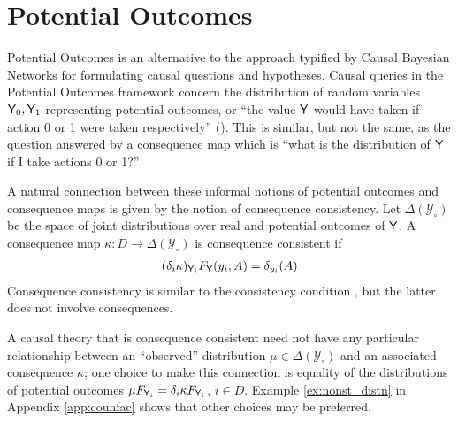 
\section{Potential Outcomes}

Potential Outcomes is an alternative to the approach typified by Causal Bayesian Networks for formulating causal questions and hypotheses. Causal queries in the Potential Outcomes framework concern the distribution of random variables $\mathsf{Y}_0, \mathsf{Y}_1$ representing potential outcomes, or ``the value $\mathsf{Y}$ would have taken if action 0 or 1 were taken respectively'' (\cite{hernan_causal_2018}). This is similar, but not the same, as the question answered by a consequence map which is ``what is the distribution of $\mathsf{Y}$ if I take actions 0 or 1?''

A natural connection between these informal notions of potential outcomes and consequence maps is given by the notion of consequence consistency. Let $\Delta(\mathcal{Y}_\circ)$ be the space of joint distributions over real and potential outcomes of $\mathsf{Y}$. A consequence map $\kappa:D\to \Delta(\mathcal{Y}_\circ)$ is consequence consistent if
\begin{align}
    (\delta_i\kappa)_{\mathsf{Y}_i} F_{\mathsf{Y}} (y_i;A)=\delta_{y_i}(A) \label{eq:oc_consist}
\end{align} 
Consequence consistency is similar to the consistency condition \citep{richardson2013single}, but the latter does not involve consequences.

A causal theory that is consequence consistent need not have any particular relationship between an ``observed'' distribution $\mu\in \Delta(\mathcal{Y}_\circ)$ and an associated consequence $\kappa$; one choice to make this connection is equality of the distributions of potential outcomes $\mu F_{\mathsf{Y}_i} = \delta_i \kappa F_{\mathsf{Y}_i}$, $i\in D$. Example \ref{ex:nonst_distn} in Appendix \ref{app:counfac} shows that other choices may be preferred.


